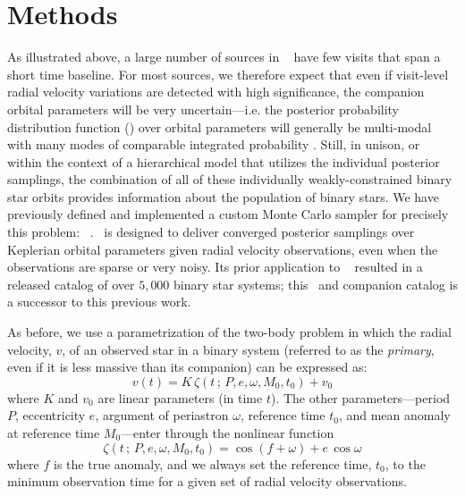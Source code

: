 \documentclass[modern]{aastex63}
\begin{document}
\section{Methods} \label{sec:methods}

As illustrated above, a large number of sources in \apogee\  have few
visits that span a short time baseline.
For most sources, we therefore expect that even if visit-level radial velocity
variations are detected with high significance, the companion orbital parameters
will be very uncertain---i.e. the posterior probability distribution function
(\pdf) over orbital parameters will generally be multi-modal with many
modes of comparable integrated probability \citep[e.g.,][]{thejoker}.
Still, in unison, or within the context of a hierarchical model that utilizes
the individual posterior samplings, the combination of all of these individually
weakly-constrained binary star orbits provides information about the population
of binary stars.
We have previously defined and implemented a custom Monte Carlo sampler for
precisely this problem: \thejoker\ \citep{thejoker}.
\thejoker\ is designed to deliver converged posterior samplings over Keplerian
orbital parameters given radial velocity observations, even when the
observations are sparse or very noisy.
Its prior application to \apogee\  \citep{Price-Whelan:2018} resulted in
a released catalog of over $5,000$ binary star systems;
this \documentname\ and companion catalog is a successor to this previous work.

As before, we use a parametrization of the two-body problem in which the radial
velocity, $v$, of an observed star in a binary system (referred to as the
\emph{primary}, even if it is less massive than its companion) can be expressed
as:
\begin{equation}
    v(t) = K \, \zeta(t \,;\, P, e, \omega, M_0, t_0) + v_0 \label{eq:kepler}
\end{equation}
where $K$ and $v_0$ are linear parameters (in time $t$).
The other parameters---period $P$, eccentricity $e$, argument of periastron
$\omega$, reference time $t_0$, and mean anomaly at reference time $M_0$---enter
through the nonlinear function
\begin{equation}
    \zeta(t \,;\, P, e, \omega, M_0, t_0) =
        \cos\left(f + \omega\right) + e\,\cos\omega \label{eq:zeta}
\end{equation}
where $f$ is the true anomaly, and we always set the reference time, $t_0$, to
the minimum observation time for a given set of radial velocity observations.
\end{document}
